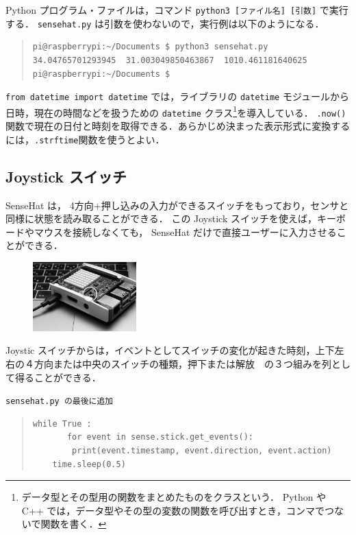 \documentclass[11pt,a4,epsf]{report}
\begin{document}
Python プログラム・ファイルは，コマンド \verb+python3 [ファイル名] [引数]+ で実行する．
\verb+sensehat.py+ は引数を使わないので，実行例は以下のようになる．
\begin{quote}
\small
\begin{verbatim}
pi@raspberrypi:~/Documents $ python3 sensehat.py 
34.04765701293945  31.003049850463867  1010.461181640625 
pi@raspberrypi:~/Documents $ 
\end{verbatim}
\end{quote}
\verb+from datetime import datetime+ では，ライブラリの \verb+datetime+ モジュールから日時，現在の時間などを扱うための \verb+datetime+ クラス\footnote{データ型とその型用の関数をまとめたものをクラスという． Python や C++ では，データ型やその型の変数の関数を呼び出すとき，コンマでつないで関数を書く．}を導入している．
\verb+.now()+ 関数で現在の日付と時刻を取得できる．あらかじめ決まった表示形式に変換するには，\verb+.strftime+関数を使うとよい．

\subsection{Joystick スイッチ}
SenseHat は， 4方向+押し込みの入力ができるスイッチをもっており，センサと同様に状態を読み取ることができる．
この Joystick スイッチを使えば，キーボードやマウスを接続しなくても， SenseHat だけで直接ユーザーに入力させることができる．

\begin{figure}
\centering
\includegraphics[width=4cm]{joystick.jpg}
\end{figure}

Joystic スイッチからは，イベントとしてスイッチの変化が起きた時刻，上下左右の４方向または中央のスイッチの種類，押下または解放　の３つ組みを列として得ることができる．
\begin{itembox}[l]{\tt sensehat.py の最後に追加}
\begin{quote}
\small
\begin{verbatim}
while True :
       for event in sense.stick.get_events():
        print(event.timestamp, event.direction, event.action)
    time.sleep(0.5)
\end{verbatim}
\end{quote}
\end{itembox}
\end{document}
